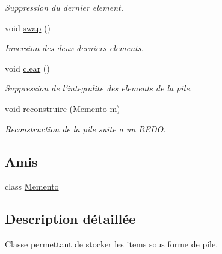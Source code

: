 \begin{CompactItemize}
\begin{CompactList}\small\item\em Suppression du dernier element. \item\end{CompactList}\item 
\hypertarget{class_pile_2c9967dc8f5dcb4372475dee52ed64c6}{
void \hyperlink{class_pile_2c9967dc8f5dcb4372475dee52ed64c6}{swap} ()}
\label{class_pile_2c9967dc8f5dcb4372475dee52ed64c6}

\begin{CompactList}\small\item\em Inversion des deux derniers elements. \item\end{CompactList}\item 
\hypertarget{class_pile_a3991438f190580607d7bbbd50ecc0c3}{
void \hyperlink{class_pile_a3991438f190580607d7bbbd50ecc0c3}{clear} ()}
\label{class_pile_a3991438f190580607d7bbbd50ecc0c3}

\begin{CompactList}\small\item\em Suppression de l'integralite des elements de la pile. \item\end{CompactList}\item 
void \hyperlink{class_pile_47db93b6d3c9d527e9c4c8afb1565e2b}{reconstruire} (\hyperlink{class_memento}{Memento} m)
\begin{CompactList}\small\item\em Reconstruction de la pile suite a un REDO. \item\end{CompactList}\end{CompactItemize}
\subsection*{Amis}
\begin{CompactItemize}
\item 
\hypertarget{class_pile_15ea7cda491e1c5873aeba1aad9d457a}{
class \hyperlink{class_pile_15ea7cda491e1c5873aeba1aad9d457a}{Memento}}
\label{class_pile_15ea7cda491e1c5873aeba1aad9d457a}

\end{CompactItemize}


\subsection{Description détaillée}
Classe permettant de stocker les items sous forme de pile. 

